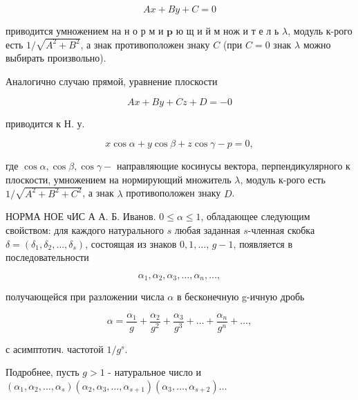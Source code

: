 \documentclass[10pt]{article}
\begin{document}
\[

A x+B y+C=0

\]



приводится умножением на н о р м и $\mathbf{p}$ ю щ и й м нож и т е л ь $\lambda$, модуль к-рого есть $1 / \sqrt{A^{2}+B^{2}}$, а знак противоположен знаку $C$ (при $C=0$ знак $\lambda$ можно выбирать произвольно).



Аналогично случаю прямой, уравнение плоскости



\[

A x+B y+C z+D=-0

\]



приводится к Н. у.



\[

x \cos \alpha+y \cos \beta+z \cos \gamma-p=0,

\]



где $\cos \alpha, \cos \beta, \cos \gamma-$ направляющие косинусы вектора, перпендикулярного к плоскости, умножением на нормирующий множитель $\lambda$, модуль к-рого есть $1 / \sqrt{A^{2}+B^{2}+C^{2}}$, а знак $\lambda$ противоположен знаку $D$.



НОРМА НОЕ чИС А А. Б. Иванов. $0 \leqslant \alpha \leqslant 1$, обладающее следующим свойством: для каждого натурального $s$ любая заданная $s$-членная скобка $\delta=\left(\delta_{1}, \delta_{2}, \ldots, \delta_{s}\right)$, состоящая из знаков $0,1, \ldots$, $g-1$, появляется в последовательности



\[

\alpha_{1}, \alpha_{2}, \alpha_{3}, \ldots, \alpha_{n}, \ldots,

\]



получающейся при разложении числа $\alpha$ в бесконечную g-ичную дробь



\[

\alpha=\frac{\alpha_{1}}{g}+\frac{\alpha_{2}}{g^{2}}+\frac{\alpha_{3}}{g^{3}}+\ldots+\frac{\alpha_{n}}{g^{n}}+\ldots,

\]



с асимптотич. частотой $1 / g^{s}$.



Подробнее, пусть $g>1$ - натуральное число и $\left(\alpha_{1}, \alpha_{2}, \ldots, \alpha_{s}\right)\left(\alpha_{2}, \alpha_{3}, \ldots, \alpha_{s+1}\right)\left(\alpha_{3}, \ldots, \alpha_{s+2}\right) \ldots$
\end{document}
